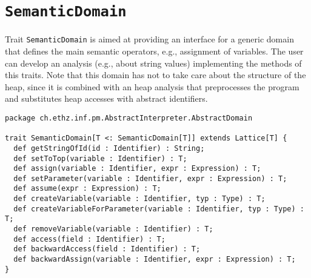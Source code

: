 \documentclass[11pt]{article}
\newcommand{\statement}[1]{\lstinline{#1}}
\begin{document}
\section{\statement{SemanticDomain}}
Trait \statement{SemanticDomain} is aimed at providing an interface for a generic domain that defines the main semantic operators, e.g., assignment of variables. The user can develop an analysis (e.g., about string values) implementing the methods of this traits. Note that this domain has not to take care about the structure of the heap, since it is combined with an heap analysis that preprocesses the program and substitutes heap accesses with abstract identifiers.

\begin{lstlisting}
package ch.ethz.inf.pm.AbstractInterpreter.AbstractDomain

trait SemanticDomain[T <: SemanticDomain[T]] extends Lattice[T] {
  def getStringOfId(id : Identifier) : String;
  def setToTop(variable : Identifier) : T;
  def assign(variable : Identifier, expr : Expression) : T;
  def setParameter(variable : Identifier, expr : Expression) : T;
  def assume(expr : Expression) : T;
  def createVariable(variable : Identifier, typ : Type) : T;
  def createVariableForParameter(variable : Identifier, typ : Type) : T;
  def removeVariable(variable : Identifier) : T;
  def access(field : Identifier) : T;
  def backwardAccess(field : Identifier) : T;
  def backwardAssign(variable : Identifier, expr : Expression) : T;
}
\end{lstlisting}
\end{document}
